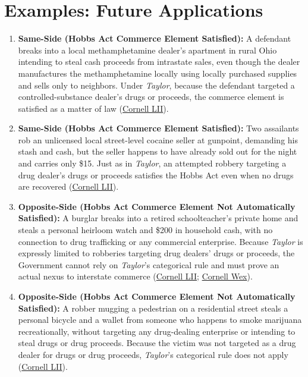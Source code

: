 \documentclass[12pt]{article}
\begin{document}
\section{Examples: Future Applications}
\begin{enumerate}
\item \textbf{Same-Side (Hobbs Act Commerce Element Satisfied):} A defendant breaks into a local methamphetamine dealer's apartment in rural Ohio intending to steal cash proceeds from intrastate sales, even though the dealer manufactures the methamphetamine locally using locally purchased supplies and sells only to neighbors. Under \textit{Taylor}, because the defendant targeted a controlled-substance dealer's drugs or proceeds, the commerce element is satisfied as a matter of law (\href{https://www.law.cornell.edu/supremecourt/text/14-6166}{Cornell LII}).
\item \textbf{Same-Side (Hobbs Act Commerce Element Satisfied):} Two assailants rob an unlicensed local street-level cocaine seller at gunpoint, demanding his stash and cash, but the seller happens to have already sold out for the night and carries only \$15. Just as in \textit{Taylor}, an attempted robbery targeting a drug dealer's drugs or proceeds satisfies the Hobbs Act even when no drugs are recovered (\href{https://www.law.cornell.edu/supremecourt/text/14-6166}{Cornell LII}).
\item \textbf{Opposite-Side (Hobbs Act Commerce Element Not Automatically Satisfied):} A burglar breaks into a retired schoolteacher's private home and steals a personal heirloom watch and \$200 in household cash, with no connection to drug trafficking or any commercial enterprise. Because \textit{Taylor} is expressly limited to robberies targeting drug dealers' drugs or proceeds, the Government cannot rely on \textit{Taylor}'s categorical rule and must prove an actual nexus to interstate commerce (\href{https://www.law.cornell.edu/supremecourt/text/14-6166}{Cornell LII}; \href{https://www.law.cornell.edu/wex/Hobbs_Act}{Cornell Wex}).
\item \textbf{Opposite-Side (Hobbs Act Commerce Element Not Automatically Satisfied):} A robber mugging a pedestrian on a residential street steals a personal bicycle and a wallet from someone who happens to smoke marijuana recreationally, without targeting any drug-dealing enterprise or intending to steal drugs or drug proceeds. Because the victim was not targeted as a drug dealer for drugs or drug proceeds, \textit{Taylor}'s categorical rule does not apply (\href{https://www.law.cornell.edu/supremecourt/text/14-6166}{Cornell LII}).

\end{enumerate}
\end{document}
